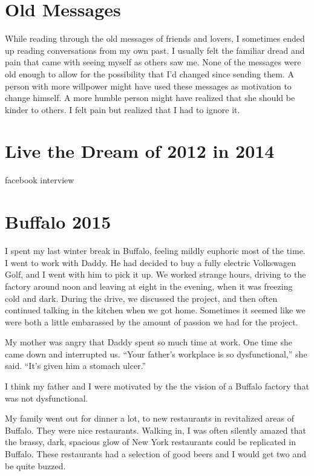 \documentclass[12pt]{memoir}
\begin{document}
\chapter{Old Messages}
While reading through the old messages of friends and lovers, I sometimes ended
up reading conversations from my own past.  I usually felt the familiar dread
and pain that came  with seeing myself as others saw me.  None of the messages
were old enough to allow for the possibility that I'd changed since sending
them.  A person with more willpower might have used these messages as motivation
to change himself.  A more humble person might have realized that she should be
kinder to others.  I felt pain but realized that I had to ignore it.

\chapter{Live the Dream of 2012 in 2014}
facebook interview

\chapter{Buffalo 2015}

I spent my last winter break in Buffalo, feeling mildly euphoric most of the
time.  I went to work with Daddy.  He had decided to buy a fully electric
Volkswagen Golf, and I went with him to pick it up.  We worked strange hours,
driving to the factory around noon and leaving at eight in the evening, when it
was freezing cold and dark.  During the drive, we discussed the project, and
then often continued talking in the kitchen when we got home.  Sometimes it
seemed like we were both a little embarassed by the amount of passion we
had for the project. 

My mother was angry that Daddy spent so much time at work.  One time she
came down and interrupted us.  ``Your father's workplace is so dysfunctional,''
she said.  ``It's given him a stomach ulcer.''

I think my father and I were motivated by the the vision of a Buffalo factory
that was not dysfunctional. 

My family went out for dinner a lot, to new restaurants in revitalized areas of
Buffalo.  They were nice restaurants.  Walking in, I was often silently amazed
that the brassy, dark, spacious glow of New York restaurants could be replicated
in Buffalo.  These restaurants had a selection of good beers and I would get two
and be quite buzzed.
\end{document}

